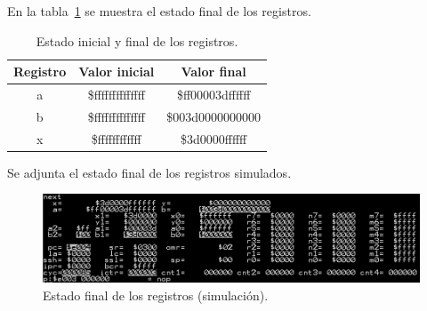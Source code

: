 En la tabla~\ref{tab:ej1_results} se muestra el estado final de los registros.

\begin{table}[H]
\centering
\begin{tabular}{|c|c|c|}
\hline
\textbf{Registro} & \textbf{Valor inicial} & \textbf{Valor final}  \\ \hline
a                 & \$ffffffffffffff       & \$ff00003dffffff      \\ \hline
b                 & \$ffffffffffffff       & \$003d0000000000      \\ \hline
x                 & \$ffffffffffff         & \$3d0000ffffff        \\ \hline
\end{tabular}
\caption{Estado inicial y final de los registros.}
\label{tab:ej1_results}
\end{table}

Se adjunta el estado final de los registros simulados.

\begin{figure}[H]
    \centering
    \includegraphics[width=\textwidth]{figs/ej1/3ra_i.png}
    \caption{Estado final de los registros (simulación).}
    \label{fig:ej1_simregs}
\end{figure}
